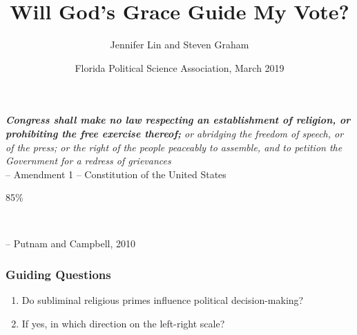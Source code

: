 \documentclass[14pt]{beamer}
\newcommand\e{\emph}
\newcommand\tb{\textbf}
\begin{document}
\author[Lin, J., and Graham, S.] %
{Jennifer Lin and Steven Graham}
	\title{Will God’s Grace Guide My Vote?}
		
	\date[FPSA 2019]{Florida Political Science Association, March 2019}
	\begin{frame}[plain]
	\maketitle
\end{frame}

\begin{frame}
\begin{center}
	\e{\tb{Congress shall make no law respecting an establishment of religion, or prohibiting the free exercise thereof;} or abridging the freedom of speech, or of the press; or the right of the people peaceably to assemble, and to petition the Government for a redress of grievances} \\
	-- Amendment 1 -- Constitution of the United States
\end{center}
\end{frame}

\begin{frame}
\begin{center}
\begin{Huge}
	85\%
\end{Huge} \\
\begin{footnotesize}
	-- Putnam and Campbell, 2010
\end{footnotesize}
\end{center}
\end{frame}

\begin{frame}
\frametitle{Guiding Questions}
\begin{enumerate}
	\item Do subliminal religious primes influence political decision-making?
	\item If yes, in which direction on the left-right scale?
\end{enumerate}
\end{frame}
\end{document}
